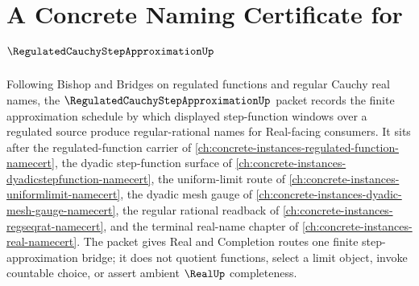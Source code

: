 \chapter{A Concrete Naming Certificate for $\RegulatedCauchyStepApproximationUp$}
\label{ch:concrete-instances-regulated-cauchy-step-approximation-namecert}

Following Bishop and Bridges on regulated functions and regular Cauchy real names, the $\RegulatedCauchyStepApproximationUp$ packet records the finite approximation schedule by which displayed step-function windows over a regulated source produce regular-rational names for Real-facing consumers. It sits after the regulated-function carrier of \autoref{ch:concrete-instances-regulated-function-namecert}, the dyadic step-function surface of \autoref{ch:concrete-instances-dyadicstepfunction-namecert}, the uniform-limit route of \autoref{ch:concrete-instances-uniformlimit-namecert}, the dyadic mesh gauge of \autoref{ch:concrete-instances-dyadic-mesh-gauge-namecert}, the regular rational readback of \autoref{ch:concrete-instances-regseqrat-namecert}, and the terminal real-name chapter of \autoref{ch:concrete-instances-real-namecert}. The packet gives Real and Completion routes one finite step-approximation bridge; it does not quotient functions, select a limit object, invoke countable choice, or assert ambient $\RealUp$ completeness.

